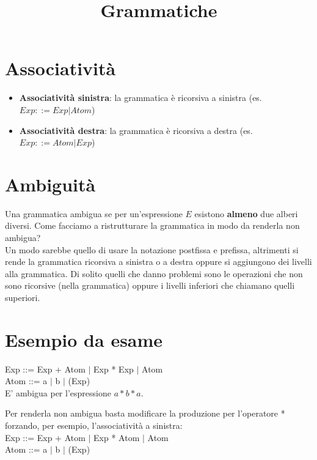 \documentclass[12pt]{article}
\title{Grammatiche}
\author{}
\date{}
\begin{document}
\maketitle
\section{Associatività}
\begin{itemize}
    \item \textbf{Associatività sinistra}: la grammatica è ricorsiva a sinistra (es. $Exp::= Exp|Atom$)
    \item \textbf{Associatività destra}: la grammatica è ricorsiva a destra (es. $Exp::= Atom|Exp$)
\end{itemize}
\section{Ambiguità}
Una grammatica ambigua se per un'espressione $E$ esistono \textbf{almeno} due alberi diversi.
Come facciamo a ristrutturare la grammatica in modo da renderla non ambigua?\\
Un modo sarebbe quello di usare la notazione postfissa e prefissa, altrimenti si rende la grammatica ricorsiva a sinistra o a destra oppure si aggiungono dei livelli alla grammatica. Di solito quelli che danno problemi sono le operazioni che non sono ricorsive (nella grammatica) oppure i livelli inferiori che chiamano quelli superiori.
\section{Esempio da esame}
Exp ::= Exp + Atom $|$ Exp * Exp $|$ Atom\\
Atom ::= a $|$ b $|$ (Exp)\\
E' ambigua per l'espressione $a*b*a$.
\begin{center}
\end{center}
Per renderla non ambigua basta modificare la produzione per  l'operatore * forzando, per esempio, l'associatività a sinistra:\\
Exp ::= Exp + Atom $|$ Exp * Atom $|$ Atom\\
Atom ::= a $|$ b $|$ (Exp)
\end{document}
